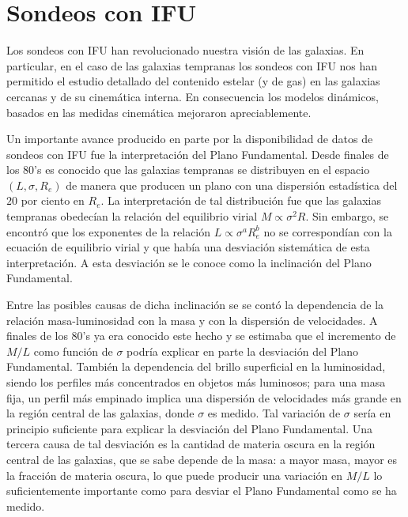 \documentclass[a4paper,twoside]{article}
\begin{document}
\section{Sondeos con IFU}
Los sondeos con IFU han revolucionado nuestra visión de las galaxias. En particular, en el caso de las galaxias tempranas los sondeos con IFU nos han permitido el estudio detallado del contenido estelar (y de gas) en las galaxias cercanas y de su cinemática interna. En consecuencia los modelos dinámicos, basados en las medidas cinemática mejoraron apreciablemente.

Un importante avance producido en parte por la disponibilidad de datos de sondeos con IFU fue la interpretación del Plano Fundamental. Desde finales de los 80's es conocido que las galaxias tempranas se distribuyen en el espacio $(L, \sigma, R_e)$ de manera que producen un plano con una dispersión estadística del $20$ por ciento en $R_e$. La interpretación de tal distribución fue que las galaxias tempranas obedecían la relación del equilibrio virial $M\propto\sigma^2R$. Sin embargo, se encontró que los exponentes de la relación $L\propto\sigma^aR_e^b$ no se correspondían con la ecuación de equilibrio virial y que había una desviación sistemática de esta interpretación. A esta desviación se le conoce como la inclinación del Plano Fundamental.

Entre las posibles causas de dicha inclinación se se contó la dependencia de la relación masa-luminosidad con la masa y con la dispersión de velocidades. A finales de los 80's ya era conocido este hecho y se estimaba que el incremento de $M/L$ como función de $\sigma$ podría explicar en parte la desviación del Plano Fundamental. También la dependencia del brillo superficial en la luminosidad, siendo los perfiles más concentrados en objetos más luminosos; para una masa fija, un perfil más empinado implica una dispersión de velocidades más grande en la región central de las galaxias, donde $\sigma$ es medido. Tal variación de $\sigma$ sería en principio suficiente para explicar la desviación del Plano Fundamental. Una tercera causa de tal desviación es la cantidad de materia oscura en la región central de las galaxias, que se sabe depende de la masa: a mayor masa, mayor es la fracción de materia oscura, lo que puede producir una variación en $M/L$ lo suficientemente importante como para desviar el Plano Fundamental como se ha medido. 
\end{document}
